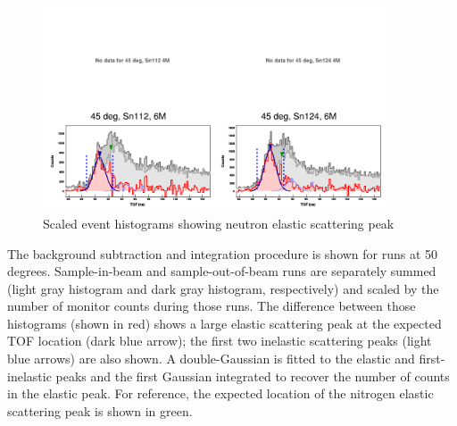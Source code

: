 \begin{figure}
    \includegraphics[width = 0.9\textwidth]{figures/tiledAngleData.png}
    \caption{Scaled event histograms showing neutron elastic scattering peak}
        \label{tiledAngleData}
\end{figure}

The background subtraction and integration procedure is shown for
        runs at 50 degrees. Sample-in-beam and sample-out-of-beam runs are
        separately summed (light gray histogram and dark gray histogram,
        respectively) and scaled by the number of monitor counts during those
        runs. The difference between those histograms (shown in red) shows a
        large elastic scattering peak at the expected TOF location (dark blue
        arrow); the first two inelastic scattering peaks (light blue arrows) are
        also shown. A double-Gaussian is fitted to the elastic and
        first-inelastic peaks and the first Gaussian integrated to recover the
        number of counts in the elastic peak. For reference, the expected location
        of the nitrogen elastic scattering peak is shown in green.

